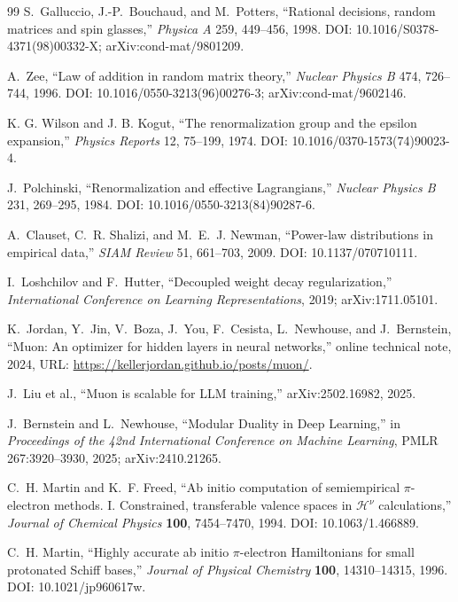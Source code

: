 \documentclass[10pt,twocolumn]{article}
\begin{document}
\begin{thebibliography}{99}
S.~Galluccio, J.-P.~Bouchaud, and M.~Potters, ``Rational decisions, random matrices and spin glasses,'' \emph{Physica A} 259, 449--456, 1998. DOI: 10.1016/S0378-4371(98)00332-X; arXiv:cond-mat/9801209.

A.~Zee, ``Law of addition in random matrix theory,'' \emph{Nuclear Physics B} 474, 726--744, 1996. DOI: 10.1016/0550-3213(96)00276-3; arXiv:cond-mat/9602146.

K. G. Wilson and J. B. Kogut, ``The renormalization group and the epsilon expansion,'' \emph{Physics Reports} 12, 75--199, 1974. DOI: 10.1016/0370-1573(74)90023-4.

J.~Polchinski, ``Renormalization and effective Lagrangians,'' \emph{Nuclear Physics B} 231, 269--295, 1984. DOI: 10.1016/0550-3213(84)90287-6.

A.~Clauset, C.~R. Shalizi, and M.~E.~J. Newman, ``Power-law distributions in empirical data,'' \emph{SIAM Review} 51, 661--703, 2009. DOI: 10.1137/070710111.

I.~Loshchilov and F.~Hutter, ``Decoupled weight decay regularization,'' \emph{International Conference on Learning Representations}, 2019; arXiv:1711.05101.

K.~Jordan, Y.~Jin, V.~Boza, J.~You, F.~Cesista, L.~Newhouse, and J.~Bernstein, ``Muon: An optimizer for hidden layers in neural networks,'' online technical note, 2024, URL: \url{https://kellerjordan.github.io/posts/muon/}.

J.~Liu et al., ``Muon is scalable for LLM training,'' arXiv:2502.16982, 2025.

J.~Bernstein and L.~Newhouse, ``Modular Duality in Deep Learning,'' in \emph{Proceedings of the 42nd International Conference on Machine Learning}, PMLR 267:3920--3930, 2025; arXiv:2410.21265.

C.~H. Martin and K.~F. Freed,
``Ab initio computation of semiempirical $\pi$-electron methods. I.
Constrained, transferable valence spaces in $\mathcal H^\nu$ calculations,''
\emph{Journal of Chemical Physics} \textbf{100}, 7454--7470, 1994.
DOI: 10.1063/1.466889.

C.~H. Martin,
``Highly accurate ab initio $\pi$-electron Hamiltonians for small protonated Schiff bases,''
\emph{Journal of Physical Chemistry} \textbf{100}, 14310--14315, 1996.
DOI: 10.1021/jp960617w.


\end{thebibliography}
\end{document}
